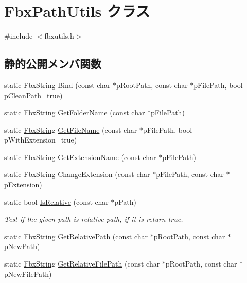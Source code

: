 \hypertarget{class_fbx_path_utils}{}\section{Fbx\+Path\+Utils クラス}
\label{class_fbx_path_utils}


{\ttfamily \#include $<$fbxutils.\+h$>$}

\subsection*{静的公開メンバ関数}
\begin{DoxyCompactItemize}
\item 
static \hyperlink{class_fbx_string}{Fbx\+String} \hyperlink{class_fbx_path_utils_a1653196effd4938fe520afd70ad09c56}{Bind} (const char $\ast$p\+Root\+Path, const char $\ast$p\+File\+Path, bool p\+Clean\+Path=true)
\item 
static \hyperlink{class_fbx_string}{Fbx\+String} \hyperlink{class_fbx_path_utils_a387c0512f521b504303361b2d79c4242}{Get\+Folder\+Name} (const char $\ast$p\+File\+Path)
\item 
static \hyperlink{class_fbx_string}{Fbx\+String} \hyperlink{class_fbx_path_utils_ac7822ad3605dcfbe63e99a848e959d50}{Get\+File\+Name} (const char $\ast$p\+File\+Path, bool p\+With\+Extension=true)
\item 
static \hyperlink{class_fbx_string}{Fbx\+String} \hyperlink{class_fbx_path_utils_a2f8743324b82737499681bdaca5adc7e}{Get\+Extension\+Name} (const char $\ast$p\+File\+Path)
\item 
static \hyperlink{class_fbx_string}{Fbx\+String} \hyperlink{class_fbx_path_utils_a8ba21a5743f08ee16fefbcd15bf58c86}{Change\+Extension} (const char $\ast$p\+File\+Path, const char $\ast$p\+Extension)
\item 
static bool \hyperlink{class_fbx_path_utils_ad95bc37bf3ed66b0f1d2ab261b238276}{Is\+Relative} (const char $\ast$p\+Path)
\begin{DoxyCompactList}\small\item\em Test if the given path is relative path, if it is return true. \end{DoxyCompactList}\item 
static \hyperlink{class_fbx_string}{Fbx\+String} \hyperlink{class_fbx_path_utils_a311c2fe8ecb6dad2fc1a3b7935378598}{Get\+Relative\+Path} (const char $\ast$p\+Root\+Path, const char $\ast$p\+New\+Path)
\item 
static \hyperlink{class_fbx_string}{Fbx\+String} \hyperlink{class_fbx_path_utils_a330b64c4fc722a47e0bb0a946249e021}{Get\+Relative\+File\+Path} (const char $\ast$p\+Root\+Path, const char $\ast$p\+New\+File\+Path)

\end{DoxyCompactItemize}

